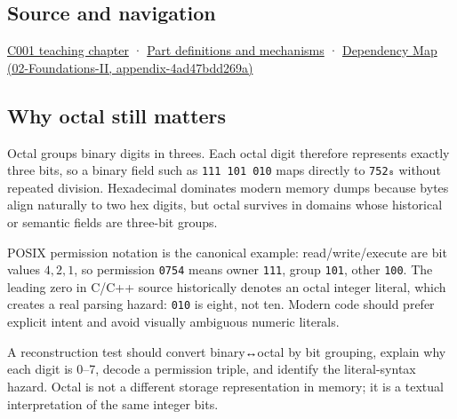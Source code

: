 \subsection{Source and navigation}\label{appendix-17fc1bc8b305-source-and-navigation}

\hyperref[01-foundations-i-ch001-from-a-signal-to-an-interpretation]{C001 teaching chapter} · \hyperref[appendix-fd090d982a15]{Part definitions and mechanisms} · \href{../02-Foundations-II/main.pdf\#nameddest=appendix-4ad47bdd269a}{Dependency Map (02-Foundations-II, appendix-4ad47bdd269a)}

\subsection{Why octal still matters}\label{appendix-17fc1bc8b305-why-octal-still-matters}

Octal groups binary digits in threes. Each octal digit therefore represents exactly three bits, so a binary field such as \texttt{111\ 101\ 010} maps directly to \texttt{752₈} without repeated division. Hexadecimal dominates modern memory dumps because bytes align naturally to two hex digits, but octal survives in domains whose historical or semantic fields are three-bit groups.

POSIX permission notation is the canonical example: read/write/execute are bit values \(4,2,1\), so permission \texttt{0754} means owner \texttt{111}, group \texttt{101}, other \texttt{100}. The leading zero in C/C++ source historically denotes an octal integer literal, which creates a real parsing hazard: \texttt{010} is eight, not ten. Modern code should prefer explicit intent and avoid visually ambiguous numeric literals.

A reconstruction test should convert binary↔octal by bit grouping, explain why each digit is 0--7, decode a permission triple, and identify the literal-syntax hazard. Octal is not a different storage representation in memory; it is a textual interpretation of the same integer bits.
